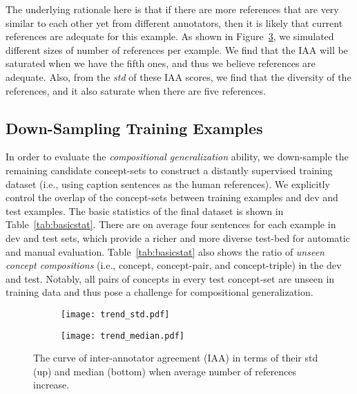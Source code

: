 \documentclass[11pt,a4paper]{article}
\begin{document}
	The underlying rationale here is that if there are more references that are very similar to each other yet from different annotators, then it is likely that current references are adequate for this example.
	As shown in Figure~\ref{fig:iaacurve}, we simulated different sizes of number of references per example. We find that the IAA will be saturated when we have the fifth ones, and thus we believe references are adequate. 
	Also, from the \textit{std} of these IAA scores, we find that the diversity of the references, and it also saturate when there are five references.




	


    


      
    
	\subsection{Down-Sampling Training Examples }
	
    In order to evaluate the \textit{compositional generalization} ability, 
    we down-sample the remaining candidate concept-sets to construct a distantly supervised training dataset (i.e., using caption sentences as the human references). 
    We explicitly control the overlap of the concept-sets between training examples and dev and test examples.
	The {basic statistics }of the final dataset is shown in Table~\ref{tab:basicstat}.
	There are on average four sentences for each example in dev and test sets, which provide a richer and more diverse test-bed for automatic and manual evaluation.
	Table~\ref{tab:basicstat} also shows the ratio of \textit{unseen concept compositions} (i.e., concept, concept-pair, and concept-triple) in the dev and test. Notably, all pairs of concepts in every test concept-set are unseen in training data and thus pose a challenge for compositional generalization.

    
        
	


\begin{figure}[t!]
\centering
\hspace{-0.4em}
\begin{subfigure}[b]{0.47\textwidth}
   \texttt{[image: trend\_std.pdf]}
   \label{fig:trend_std} 
\end{subfigure}

\begin{subfigure}[b]{0.482\textwidth}
    \vspace{-2.4em}
    \hspace{-0.4em}
   \texttt{[image: trend\_median.pdf]}
   \label{fig:trend_median}
\end{subfigure}
\vspace{-2em}
\caption[Two numerical solutions]{The curve of inter-annotator agreement (IAA) in terms of their std (up) and median (bottom) when average number of references increase.}
\label{fig:iaacurve}
\end{figure}
\end{document}
